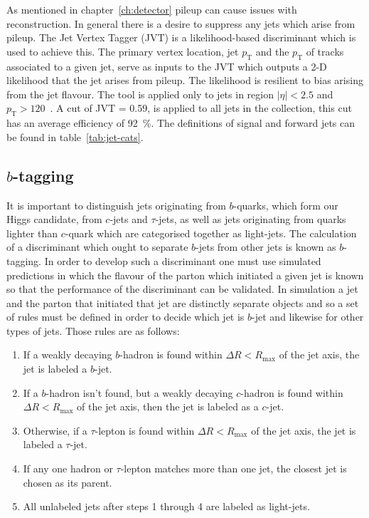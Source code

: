 As mentioned in chapter~\ref{ch:detector} pileup can cause issues with
reconstruction. In general there is a desire to suppress any jets which arise
from pileup. The Jet Vertex Tagger (JVT) is a likelihood-based discriminant
which is used to achieve this. The primary vertex location, jet $p_{\mathrm{T}}$ and the
$p_{\mathrm{T}}$ of tracks associated to a given jet, serve as inputs to the JVT which
outputs a 2-D likelihood that the jet arises from pileup. The likelihood is
resilient to bias arising from the jet flavour. The tool is applied only to jets
in region $\lvert  \eta \rvert < 2.5$ and $p_{\mathrm{T}} > 120$~\GeV. A cut of JVT = 0.59,
is applied to all jets in the collection, this cut has an average efficiency of
92~\%. The definitions of signal and forward jets can be found in
table~\ref{tab:jet-cats}.


\subsection{\texorpdfstring{$b$}{b}-tagging}
\label{sec:btagging}

It is important to distinguish jets originating from $b$-quarks, which form our
Higgs candidate, from $c$-jets and $\tau$-jets, as well as jets originating from
quarks lighter than $c$-quark which are categorised together as light-jets. The
calculation of a discriminant which ought to separate $b$-jets from other jets is
known as $b$-tagging. In order to develop such a discriminant one must use
simulated predictions in which the flavour of the parton which initiated a given
jet is known so that the performance of the discriminant can be validated. In
simulation a jet and the parton that initiated that jet are distinctly separate
objects and so a set of rules must be defined in order to decide which jet is
$b$-jet and likewise for other types of jets. Those rules are as follows:
\begin{enumerate}
\item  If a weakly decaying $b$-hadron is found within $\Delta R<R_{\text{max}}$ of the
  jet axis, the jet is labeled a $b$-jet.
\item  If a $b$-hadron isn't found, but a weakly decaying $c$-hadron is
  found within $\Delta R<R_{\text{max}}$ of the jet axis, then the jet is labeled as a $c$-jet.
\item  Otherwise, if a $\tau$-lepton is found within
  $\Delta R<R_{\text{max}}$ of the jet axis, the jet is labeled a $\tau$-jet.
\item If any one hadron or $\tau$-lepton matches more than one jet, the closest jet
  is chosen as its parent.
\item All unlabeled jets after steps 1 through 4 are labeled as light-jets.
\end{enumerate}

